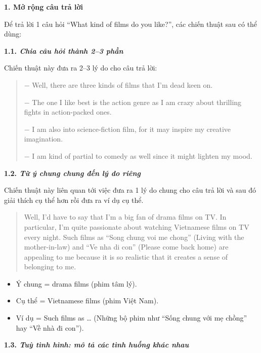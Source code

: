 \vspace{.5cm}
\textbf{\large 1. Mở rộng câu trả lời}  
\vspace{.25cm}

Để trả lời 1 câu hỏi ``What kind of films do you like?'', các chiến thuật sau có thể dùng:

\bigskip
\textbf{1.1. \textit{Chia câu hỏi thành 2--3 phần}}  

\vspace{.25cm}
Chiến thuật này đưa ra 2--3 lý do cho câu trả lời:  

\begin{quote}

$-$ Well, there are three kinds of films that I'm dead keen on.  

$-$ The one I like best is the action genre as I am crazy about thrilling fights in action-packed ones.  

$-$ I am also into science-fiction film, for it may inspire my creative imagination.  

$-$ I am kind of partial to comedy as well since it might lighten my mood.  
\end{quote}

\bigskip
\textbf{1.2. \textit{Từ ý chung chung đến lý do riêng}}  

\vspace{.25cm}
Chiến thuật này liên quan tới việc đưa ra 1 lý do chung cho câu trả lời và sau đó giải thích cụ thể hơn rồi đưa ra ví dụ cụ thể.  

\begin{quote}
Well, I'd have to say that I'm a big fan of drama films on TV. In particular, I'm quite passionate about watching Vietnamese films on TV every night. Such films as ``Song chung voi me chong'' (Living with the mother-in-law) and ``Ve nha di con'' (Please come back home) are appealing to me because it is so realistic that it creates a sense of belonging to me.  
\end{quote}

\begin{itemize}
    \item Ý chung = drama films (phim tâm lý).
    \item Cụ thể = Vietnamese films (phim Việt Nam). 
    \item Ví dụ = Such films as … (Những bộ phim như ``Sống chung với mẹ chồng'' hay ``Về nhà đi con'').    
\end{itemize}


\bigskip
\textbf{1.3. \textit{Tuỳ tình hình: mô tả các tình huống khác nhau}}  

